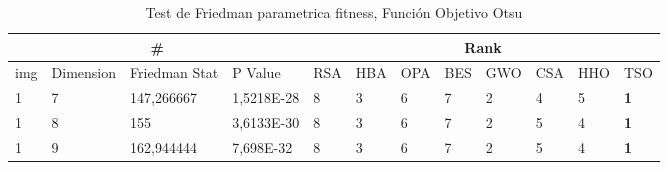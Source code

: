\documentclass[conference]{IEEEtran}
\begin{document}
\begin{table}[]
	\centering
	\caption{Test de Friedman parametrica fitness, Función Objetivo Otsu}
	\begin{tabular}{|llll|llllllll|}
		\hline
		\multicolumn{4}{|c|}{\#} & \multicolumn{8}{c|}{Rank} \\ \hline
		\multicolumn{1}{|l|}{img} & \multicolumn{1}{l|}{Dimension} & \multicolumn{1}{l|}{Friedman Stat} & P Value & \multicolumn{1}{l|}{RSA} & \multicolumn{1}{l|}{HBA} & \multicolumn{1}{l|}{OPA} & \multicolumn{1}{l|}{BES} & \multicolumn{1}{l|}{GWO} & \multicolumn{1}{l|}{CSA} & \multicolumn{1}{l|}{HHO} & TSO \\ \hline 
\multicolumn{1}{|l|}{1}                                                     & \multicolumn{1}{l|}{7}                                                        & \multicolumn{1}{l|}{147,266667}                                                   & 1,5218E-28                     & \multicolumn{1}{l|}{8}                                                  & \multicolumn{1}{l|}{3}                                                  & \multicolumn{1}{l|}{6}                                                  & \multicolumn{1}{l|}{7}                                                  & \multicolumn{1}{l|}{2}                                                  & \multicolumn{1}{l|}{4}                                                  & \multicolumn{1}{l|}{5}                                                  & \textbf{1}                 \\ \hline
\multicolumn{1}{|l|}{1}                                                     & \multicolumn{1}{l|}{8}                                                        & \multicolumn{1}{l|}{155}                                                          & 3,6133E-30                     & \multicolumn{1}{l|}{8}                                                  & \multicolumn{1}{l|}{3}                                                  & \multicolumn{1}{l|}{6}                                                  & \multicolumn{1}{l|}{7}                                                  & \multicolumn{1}{l|}{2}                                                  & \multicolumn{1}{l|}{5}                                                  & \multicolumn{1}{l|}{4}                                                  & \textbf{1}                 \\ \hline
\multicolumn{1}{|l|}{1}                                                     & \multicolumn{1}{l|}{9}                                                        & \multicolumn{1}{l|}{162,944444}                                                   & 7,698E-32                      & \multicolumn{1}{l|}{8}                                                  & \multicolumn{1}{l|}{3}                                                  & \multicolumn{1}{l|}{6}                                                  & \multicolumn{1}{l|}{7}                                                  & \multicolumn{1}{l|}{2}                                                  & \multicolumn{1}{l|}{5}                                                  & \multicolumn{1}{l|}{4}                                                  & \textbf{1}                 \\ \hline

\end{tabular}
\end{table}
\end{document}
